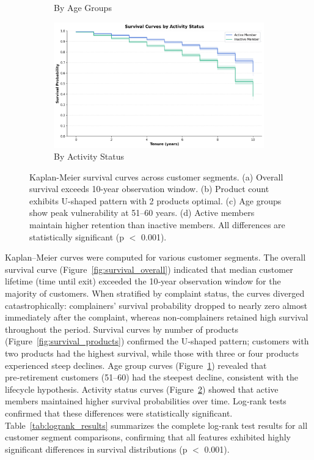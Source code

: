 \documentclass[12pt]{article}
\begin{document}
\begin{figure}[H]
\begin{subfigure}[b]{0.48\textwidth}
\caption{By Age Groups}
\label{fig:survival_age}
\end{subfigure}
\hfill
\begin{subfigure}[b]{0.48\textwidth}
\centering
\includegraphics[width=\textwidth]{img/12_survival_active_status_plot.png}
\caption{By Activity Status}
\label{fig:survival_active}
\end{subfigure}
\caption{Kaplan-Meier survival curves across customer segments. (a) Overall survival exceeds 10-year observation window. (b) Product count exhibits U-shaped pattern with 2 products optimal. (c) Age groups show peak vulnerability at 51–60 years. (d) Active members maintain higher retention than inactive members. All differences are statistically significant (p $<$ 0.001).}
\label{fig:survival_all}
\end{figure}

Kaplan–Meier curves were computed for various customer segments.  The overall survival curve (Figure~\ref{fig:survival_overall}) indicated that median customer lifetime (time until exit) exceeded the 10‑year observation window for the majority of customers.  When stratified by complaint status, the curves diverged catastrophically: complainers' survival probability dropped to nearly zero almost immediately after the complaint, whereas non‑complainers retained high survival throughout the period.  Survival curves by number of products (Figure~\ref{fig:survival_products}) confirmed the U‑shaped pattern; customers with two products had the highest survival, while those with three or four products experienced steep declines.  Age group curves (Figure~\ref{fig:survival_age}) revealed that pre‑retirement customers (51–60) had the steepest decline, consistent with the lifecycle hypothesis.  Activity status curves (Figure~\ref{fig:survival_active}) showed that active members maintained higher survival probabilities over time.  Log‑rank tests confirmed that these differences were statistically significant. Table~\ref{tab:logrank_results} summarizes the complete log‑rank test results for all customer segment comparisons, confirming that all features exhibited highly significant differences in survival distributions (p $<$ 0.001).
\end{document}
